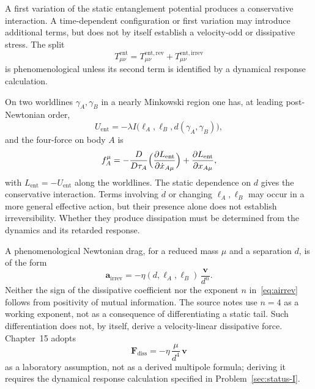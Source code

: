 A first variation of the static entanglement potential produces a
conservative interaction. A time-dependent configuration or
first variation may introduce additional terms, but does not by
itself establish a velocity-odd or dissipative stress. The split
\begin{equation}
  \label{eq:Tent-split}
  T_{\mu\nu}^{\mathrm{ent}}
  =T_{\mu\nu}^{\mathrm{ent,rev}}
   +T_{\mu\nu}^{\mathrm{ent,irrev}}
\end{equation}
is phenomenological unless its second term is identified by a
dynamical response calculation.

On two worldlines \(\gamma_A,\gamma_B\) in a nearly Minkowski
region one has, at leading post-Newtonian order,
\begin{equation}
  \label{eq:U-PN}
  U_{\mathrm{ent}}
  =-\lambda I\bigl(\ell_A,\ell_B,d(\gamma_A,\gamma_B)\bigr),
\end{equation}
and the four-force on body \(A\) is
\begin{equation}
  \label{eq:four-force}
  f^\mu_A
  =-\frac{D}{D\tau_A}
    \Bigl(
      \frac{\partial L_{\mathrm{ent}}}{\partial \dot x_{A\mu}}
    \Bigr)
    +\frac{\partial L_{\mathrm{ent}}}{\partial x_{A\mu}},
\end{equation}
with \(L_{\mathrm{ent}}=-U_{\mathrm{ent}}\) along the worldlines.
The static dependence on \(d\) gives the conservative interaction.
Terms involving \(\dot d\) or changing \(\ell_A,\ell_B\) may occur
in a more general effective action, but their presence alone does
not establish irreversibility. Whether they produce dissipation
must be determined from the dynamics and its retarded response.

A phenomenological Newtonian drag, for a reduced mass \(\mu\) and a
separation \(d\), is of the form
\begin{equation}
  \label{eq:airrev}
  \mathbf{a}_{\mathrm{irrev}}
  =-\eta(d,\ell_A,\ell_B)\,
    \frac{\mathbf{v}}{d^{n}}.
\end{equation}
Neither the sign of the dissipative coefficient nor the exponent
\(n\) in~\eqref{eq:airrev} follows from positivity of mutual
information. The source notes use \(n=4\) as a working exponent,
not as a consequence of differentiating a static tail. Such
differentiation does not, by itself, derive a velocity-linear
dissipative force. Chapter~15 adopts
\begin{equation}
  \label{eq:airrev-lab}
  \mathbf{F}_{\mathrm{diss}}
  =-\eta\,\frac{\mu}{d^4}\,\mathbf{v}
\end{equation}
as a laboratory assumption, not as a derived multipole formula;
deriving it requires the dynamical response calculation specified
in Problem~\ref{sec:status-I}.

